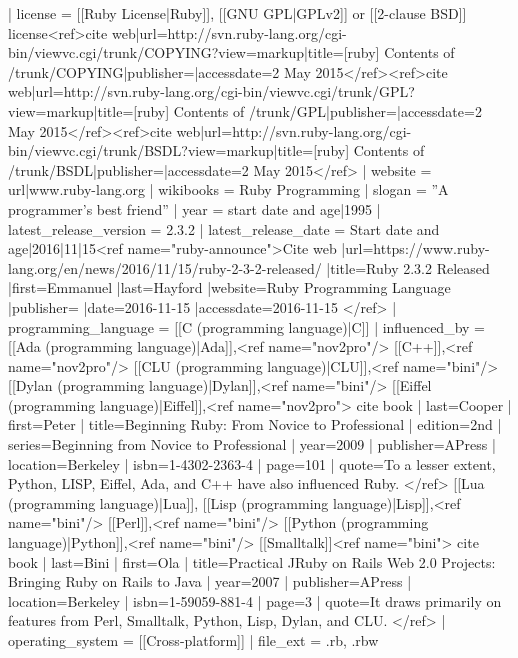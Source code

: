 {{ | license                 = [[Ruby License|Ruby]], [[GNU GPL|GPLv2]] or [[2-clause BSD]] license<ref>{{cite web|url=http://svn.ruby-lang.org/cgi-bin/viewvc.cgi/trunk/COPYING?view=markup|title=[ruby] Contents of /trunk/COPYING|publisher=|accessdate=2 May 2015}}</ref><ref>{{cite web|url=http://svn.ruby-lang.org/cgi-bin/viewvc.cgi/trunk/GPL?view=markup|title=[ruby] Contents of /trunk/GPL|publisher=|accessdate=2 May 2015}}</ref><ref>{{cite web|url=http://svn.ruby-lang.org/cgi-bin/viewvc.cgi/trunk/BSDL?view=markup|title=[ruby] Contents of /trunk/BSDL|publisher=|accessdate=2 May 2015}}</ref>
 | website                 = {{url|www.ruby-lang.org}}
 | wikibooks               = Ruby Programming
| slogan                 = ''A programmer's best friend''
 | year                   = {{start date and age|1995}}
 | latest_release_version = 2.3.2
 | latest_release_date    = {{Start date and age|2016|11|15}}<ref name="ruby-announce">{{Cite web
                           |url=https://www.ruby-lang.org/en/news/2016/11/15/ruby-2-3-2-released/
                           |title=Ruby 2.3.2 Released
                           |first=Emmanuel
                           |last=Hayford
                           |website=Ruby Programming Language
                           |publisher=
                           |date=2016-11-15
                           |accessdate=2016-11-15
                           }}</ref>
 | programming_language   = [[C (programming language)|C]]
 | influenced_by           = [[Ada (programming language)|Ada]],<ref name="nov2pro"/> [[C++]],<ref name="nov2pro"/> [[CLU (programming language)|CLU]],<ref name="bini"/> [[Dylan (programming language)|Dylan]],<ref name="bini"/> [[Eiffel (programming language)|Eiffel]],<ref name="nov2pro">
{{cite book
   | last=Cooper
   | first=Peter
   | title=Beginning Ruby: From Novice to Professional
   | edition=2nd
   | series=Beginning from Novice to Professional
   | year=2009
   | publisher=APress
   | location=Berkeley
   | isbn=1-4302-2363-4
   | page=101
   | quote=To a lesser extent, Python, LISP, Eiffel, Ada, and C++ have also influenced Ruby.}}
</ref> [[Lua (programming language)|Lua]], [[Lisp (programming language)|Lisp]],<ref name="bini"/> [[Perl]],<ref name="bini"/> [[Python (programming language)|Python]],<ref name="bini"/> [[Smalltalk]]<ref name="bini">
{{cite book
   | last=Bini
   | first=Ola
   | title=Practical JRuby on Rails Web 2.0 Projects: Bringing Ruby on Rails to Java
   | year=2007
   | publisher=APress
   | location=Berkeley
   | isbn=1-59059-881-4
   | page=3
   | quote=It draws primarily on features from Perl, Smalltalk, Python, Lisp, Dylan, and CLU.}}
</ref>
 | operating_system        = [[Cross-platform]]
 | file_ext                = .rb, .rbw
 }}

